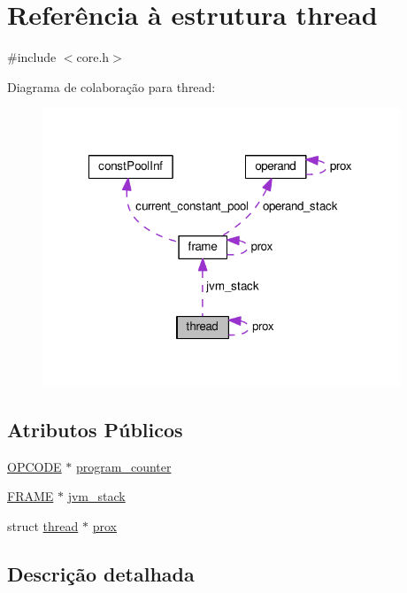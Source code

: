 \hypertarget{structthread}{\section{Referência à estrutura thread}
\label{structthread}
}


{\ttfamily \#include $<$core.\-h$>$}



Diagrama de colaboração para thread\-:\nopagebreak
\begin{figure}[H]
\begin{center}
\leavevmode
\includegraphics[width=303pt]{structthread__coll__graph}
\end{center}
\end{figure}
\subsection*{Atributos Públicos}
\begin{DoxyCompactItemize}
\item 
\hyperlink{core_8h_ab34056db44556fbb28ffa6aff4873b4c}{O\-P\-C\-O\-D\-E} $\ast$ \hyperlink{structthread_ab5f04be4cab8242e674775d1538dfa43}{program\-\_\-counter}
\item 
\hyperlink{core_8h_ad2c7f62ece09f452ea1a5285adcc503c}{F\-R\-A\-M\-E} $\ast$ \hyperlink{structthread_a45e1dff8e8c5d2981ee351857fbd765c}{jvm\-\_\-stack}
\item 
struct \hyperlink{structthread}{thread} $\ast$ \hyperlink{structthread_aa2c034fdf01f832556b8bf192ab57dcc}{prox}
\end{DoxyCompactItemize}


\subsection{Descrição detalhada}


